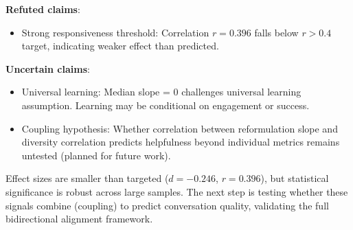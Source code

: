 \textbf{Refuted claims}:
\begin{itemize}
\item[$\times$] Strong responsiveness threshold: Correlation $r=0.396$ falls below $r>0.4$ target, indicating weaker effect than predicted.
\end{itemize}

\textbf{Uncertain claims}:
\begin{itemize}
\item[?] Universal learning: Median slope = 0 challenges universal learning assumption. Learning may be conditional on engagement or success.
\item[?] Coupling hypothesis: Whether correlation between reformulation slope and diversity correlation predicts helpfulness beyond individual metrics remains untested (planned for future work).
\end{itemize}

Effect sizes are smaller than targeted ($d=-0.246$, $r=0.396$), but statistical significance is robust across large samples. The next step is testing whether these signals combine (coupling) to predict conversation quality, validating the full bidirectional alignment framework.
